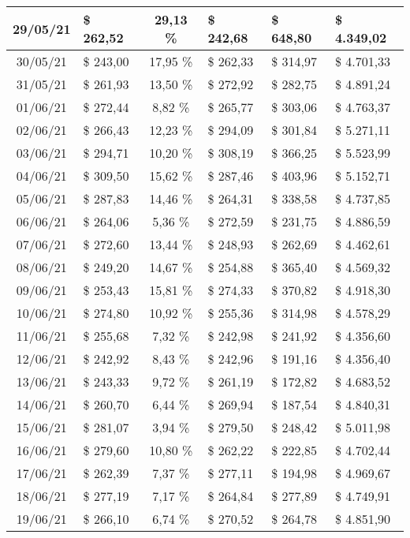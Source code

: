 \begin{center}
\begin{small}
\begin{longtable}{|c|l|c|l|l|l|}
29/05/21 & \$ 262,52 & 29,13 \% & \$ 242,68 & \$ 648,80 & \$ 4.349,02 \\ \hline
30/05/21 & \$ 243,00 & 17,95 \% & \$ 262,33 & \$ 314,97 & \$ 4.701,33 \\ \hline
31/05/21 & \$ 261,93 & 13,50 \% & \$ 272,92 & \$ 282,75 & \$ 4.891,24 \\ \hline
01/06/21 & \$ 272,44 & 8,82 \% & \$ 265,77 & \$ 303,06 & \$ 4.763,37 \\ \hline
02/06/21 & \$ 266,43 & 12,23 \% & \$ 294,09 & \$ 301,84 & \$ 5.271,11 \\ \hline
03/06/21 & \$ 294,71 & 10,20 \% & \$ 308,19 & \$ 366,25 & \$ 5.523,99 \\ \hline
04/06/21 & \$ 309,50 & 15,62 \% & \$ 287,46 & \$ 403,96 & \$ 5.152,71 \\ \hline
05/06/21 & \$ 287,83 & 14,46 \% & \$ 264,31 & \$ 338,58 & \$ 4.737,85 \\ \hline
06/06/21 & \$ 264,06 & 5,36 \% & \$ 272,59 & \$ 231,75 & \$ 4.886,59 \\ \hline
07/06/21 & \$ 272,60 & 13,44 \% & \$ 248,93 & \$ 262,69 & \$ 4.462,61 \\ \hline
08/06/21 & \$ 249,20 & 14,67 \% & \$ 254,88 & \$ 365,40 & \$ 4.569,32 \\ \hline
09/06/21 & \$ 253,43 & 15,81 \% & \$ 274,33 & \$ 370,82 & \$ 4.918,30 \\ \hline
10/06/21 & \$ 274,80 & 10,92 \% & \$ 255,36 & \$ 314,98 & \$ 4.578,29 \\ \hline
11/06/21 & \$ 255,68 & 7,32 \% & \$ 242,98 & \$ 241,92 & \$ 4.356,60 \\ \hline
12/06/21 & \$ 242,92 & 8,43 \% & \$ 242,96 & \$ 191,16 & \$ 4.356,40 \\ \hline
13/06/21 & \$ 243,33 & 9,72 \% & \$ 261,19 & \$ 172,82 & \$ 4.683,52 \\ \hline
14/06/21 & \$ 260,70 & 6,44 \% & \$ 269,94 & \$ 187,54 & \$ 4.840,31 \\ \hline
15/06/21 & \$ 281,07 & 3,94 \% & \$ 279,50 & \$ 248,42 & \$ 5.011,98 \\ \hline
16/06/21 & \$ 279,60 & 10,80 \% & \$ 262,22 & \$ 222,85 & \$ 4.702,44 \\ \hline
17/06/21 & \$ 262,39 & 7,37 \% & \$ 277,11 & \$ 194,98 & \$ 4.969,67 \\ \hline
18/06/21 & \$ 277,19 & 7,17 \% & \$ 264,84 & \$ 277,89 & \$ 4.749,91 \\ \hline
19/06/21 & \$ 266,10 & 6,74 \% & \$ 270,52 & \$ 264,78 & \$ 4.851,90 \\ \hline

\end{longtable}
\end{small}
\end{center}
